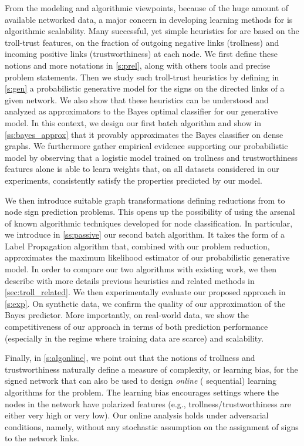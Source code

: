 From the modeling and algorithmic viewpoints, because of the huge amount of available networked
data, a major concern in developing learning methods for \esp{} is algorithmic
scalability. Many successful, yet simple heuristics for \esp{} are based on the
troll-trust features, \ie{} on the fraction of outgoing negative links (trollness) and incoming
positive links (trustworthiness) at each node. We first define these notions and more notations in
\autoref{s:prel}, along with others tools and precise problem statements. Then we study such
troll-trust heuristics by defining in \autoref{s:gen} a probabilistic
generative model for the signs on the directed links of a given network. We also show that these
heuristics can be understood and analyzed as approximators to the Bayes optimal classifier for our
generative model. In this context, we design our first batch algorithm and show in
\autoref{ss:bayes_approx} that it provably approximates the Bayes classifier on dense graphs.
We furthermore gather empirical evidence supporting our probabilistic model by observing
that a logistic model trained on trollness and trustworthiness features alone is able to learn
weights that, on all datasets considered in our experiments, consistently satisfy the properties
predicted by our model.

We then introduce suitable graph transformations defining reductions from \esp{} to
node sign prediction problems. This opens up the possibility of using the arsenal of known
algorithmic techniques developed for node classification. In particular, we introduce in
\autoref{ss:passive} our second batch algorithm. It takes the form of a Label
Propagation algorithm that, combined with our problem reduction, approximates the maximum likelihood
estimator of our probabilistic generative model.
In order to compare our two algorithms with existing work, we then describe with more details
previous heuristics and related methods in \autoref{sec:troll_related}.
We then experimentally evaluate our proposed approach in \autoref{s:exp}. On synthetic data, we
confirm the quality of our approximation of the Bayes predictor. More importantly, on real-world
data, we show the competitiveness of our approach in terms of both prediction performance
(especially in the regime where training data are scarce) and scalability.

Finally, in \autoref{s:algonline}, we point out that the notions of trollness and trustworthiness
naturally define a measure
of complexity, or learning bias, for the signed network that can also be used to design
\emph{online} (\ie{} sequential) learning algorithms for the \esp{} problem. The
learning bias encourages settings where the nodes in the network have polarized features (e.g.,
trollness/trustworthiness are either very high or very low). Our online analysis holds under
adversarial conditions, namely, without any stochastic assumption on the assignment of signs to the
network links.
